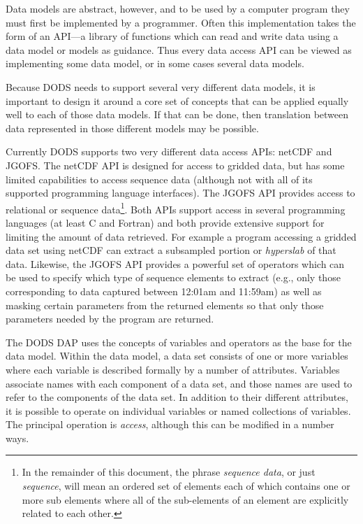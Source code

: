 Data models are abstract, however, and to be used by a computer program they
must first be implemented by a programmer. Often this implementation takes
the form of an API---a library of functions which can read and write data
using a data model or models as guidance. Thus every data access API can be
viewed as implementing some data model, or in some cases several data models.

Because DODS needs to support several very different data models, it is
important to design it around a core set of concepts that can be applied
equally well to each of those data models. If that can be done, then
translation between data represented in those different models may be
possible.

Currently DODS supports two very different data access APIs: netCDF and
JGOFS\@. The netCDF API is designed for access to gridded data, but has some
limited capabilities to access sequence data (although not with all of its
supported programming language interfaces). The JGOFS API provides access to
relational or sequence data\footnote{In the remainder of this document, the
  phrase {\em sequence data}, or just {\em sequence}, will mean an ordered
  set of elements each of which contains one or more sub elements where all
  of the sub-elements of an element are explicitly related to each other.}.
Both APIs support access in several programming languages (at least C and
Fortran) and both provide extensive support for limiting the amount of data
retrieved.  For example a program accessing a gridded data set using netCDF
can extract a subsampled portion or {\em hyperslab\/} of that data.  Likewise,
the JGOFS API provides a powerful set of operators which can be used to
specify which type of sequence elements to extract (e.g., only those
corresponding to data captured between 12:01am and 11:59am) as well as
masking certain parameters from the returned elements so that only those
parameters needed by the program are returned.

The DODS DAP uses the concepts of variables and operators as the base for the
data model. Within the data model, a data set consists of one or more
variables where each variable is described formally by a number of
attributes.  Variables associate names with each component of a data set, and
those names are used to refer to the components of the data set. In addition
to their different attributes, it is possible to operate on individual
variables or named collections of variables. The principal operation is {\em
  access}, although this can be modified in a number ways.

